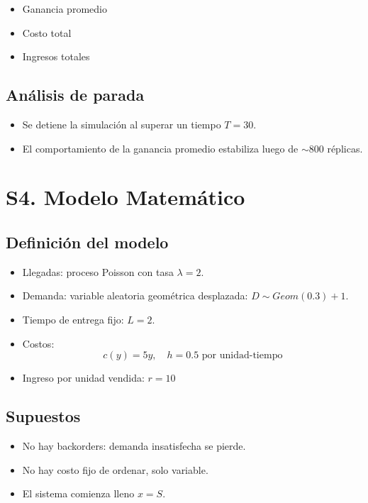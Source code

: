 \documentclass{report}
\begin{document}
\begin{itemize}
\item Ganancia promedio
\item Costo total
\item Ingresos totales
\end{itemize}

\subsection*{Análisis de parada}

\begin{itemize}
\item Se detiene la simulación al superar un tiempo \(T = 30\).
\item El comportamiento de la ganancia promedio estabiliza luego de $\sim$800 réplicas.
\end{itemize}


\section*{S4. Modelo Matemático}

\subsection*{Definición del modelo}

\begin{itemize}
\item Llegadas: proceso Poisson con tasa \(\lambda = 2\).
\item Demanda: variable aleatoria geométrica desplazada: \(D \sim Geom(0.3)+1\).
\item Tiempo de entrega fijo: \(L = 2\).
\item Costos:
  \[ c(y) = 5y, \quad h = 0.5 \text{ por unidad-tiempo} \]
\item Ingreso por unidad vendida: \(r = 10\)
\end{itemize}

\subsection*{Supuestos}

\begin{itemize}
\item No hay backorders: demanda insatisfecha se pierde.
\item No hay costo fijo de ordenar, solo variable.
\item El sistema comienza lleno \(x = S\).
\end{itemize}
\end{document}
